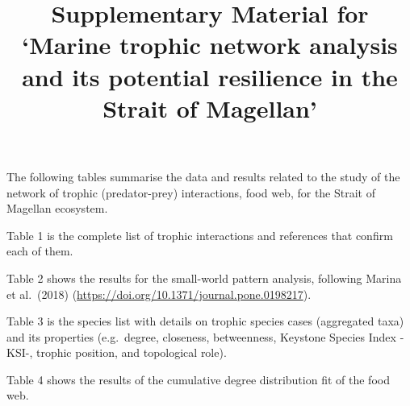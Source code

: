 \documentclass[
]{article}
\title{Supplementary Material for `Marine trophic network analysis and
its potential resilience in the Strait of Magellan'}
\author{}
\date{\vspace{-2.5em}}
\begin{document}
\maketitle

The following tables summarise the data and results related to the study
of the network of trophic (predator-prey) interactions, food web, for
the Strait of Magellan ecosystem.

Table 1 is the complete list of trophic interactions and references that
confirm each of them.

Table 2 shows the results for the small-world pattern analysis,
following Marina et al.~(2018)
(\url{https://doi.org/10.1371/journal.pone.0198217}).

Table 3 is the species list with details on trophic species cases
(aggregated taxa) and its properties (e.g.~degree, closeness,
betweenness, Keystone Species Index -KSI-, trophic position, and
topological role).

Table 4 shows the results of the cumulative degree distribution fit of
the food web.
\end{document}
